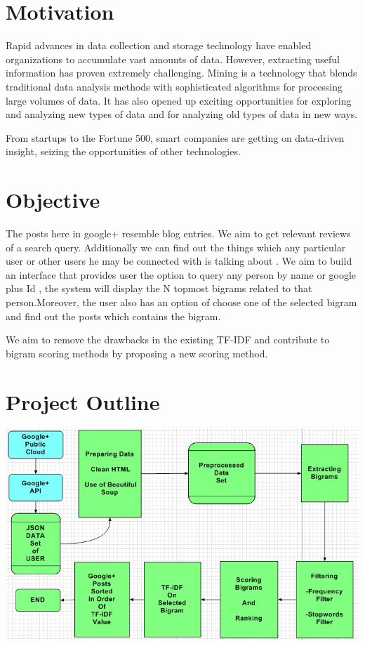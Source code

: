 \documentclass{mnnit}
\begin{document}
 
\newpage

\section{Motivation}
Rapid advances in data collection and storage technology have enabled organizations to accumulate vast amounts of data. However, extracting useful information has proven extremely challenging. Mining is a technology that blends traditional data analysis methods with sophisticated algorithms for processing large volumes of data. It has also opened up exciting opportunities for exploring and analyzing new types of data and for analyzing old types of data in new ways. 



\noindent From startups to the Fortune 500, smart companies are getting on data-driven insight, seizing the opportunities of other technologies.
\vspace{10 mm}

\section{Objective}
The posts here in google+ resemble blog entries. We aim to get relevant reviews of a search query. Additionally we can find out the things which any particular user or other users he may be connected with is talking about . We aim to build an interface that provides user the option to query any person by name or google plus Id , the system will display the N topmost bigrams related to that person.Moreover, the user also has an option of choose one of the selected bigram and find out the posts which contains the bigram. 
	
\noindent We aim to remove the drawbacks in the existing TF-IDF and contribute to bigram scoring methods by proposing a new scoring method. 
	

\newpage


\section{Project Outline}

\vspace{40 mm}


 \includegraphics[width=175mm]{Flowchart.jpg}
\end{document}
